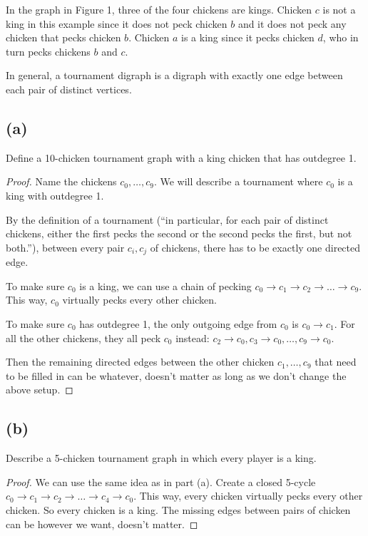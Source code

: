 \documentclass[14pt]{extarticle}
\begin{document}
In the graph in Figure 1, three of the four chickens are kings. Chicken $c$ is not a king in this example since it does not peck chicken $b$ and it does not peck any chicken that pecks chicken $b$. Chicken $a$ is a king since it pecks chicken $d$, who in turn pecks chickens $b$ and $c$.

In general, a tournament digraph is a digraph with exactly one edge between each pair of distinct vertices.

\subsection{(a)}

Define a 10-chicken tournament graph with a king chicken that has outdegree 1.

\begin{proof}
Name the chickens $c_0, \ldots, c_9$. We will describe a tournament where $c_0$ is a king with outdegree 1.

By the definition of a tournament (``in particular, for each pair of distinct chickens, either the first pecks the second or the second pecks the first, but not both.''), between every pair $c_i, c_j$ of chickens, there has to be exactly one directed edge.

To make sure $c_0$ is a king, we can use a chain of pecking $c_0 \rightarrow c_1 \rightarrow c_2 \rightarrow \ldots \rightarrow c_9$. This way, $c_0$ virtually pecks every other chicken.

To make sure $c_0$ has outdegree 1, the only outgoing edge from $c_0$ is $c_0 \rightarrow c_1$. For all the other chickens, they all peck $c_0$ instead: $c_2 \rightarrow c_0, c_3 \rightarrow c_0, \ldots, c_9 \rightarrow c_0$.

Then the remaining directed edges between the other chicken $c_1, \ldots, c_9$ that need to be filled in can be whatever, doesn't matter as long as we don't change the above setup.
\end{proof}

\subsection{(b)}

Describe a 5-chicken tournament graph in which every player is a king.

\begin{proof}
We can use the same idea as in part (a). Create a closed 5-cycle $c_0 \rightarrow c_1 \rightarrow c_2 \rightarrow \ldots \rightarrow c_4 \rightarrow c_0$. This way, every chicken virtually pecks every other chicken. So every chicken is a king. The missing edges between pairs of chicken can be however we want, doesn't matter.
\end{proof}
\end{document}

